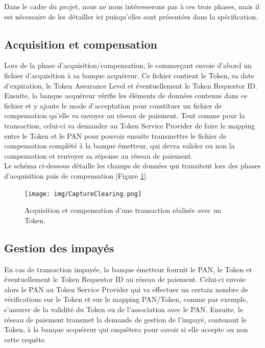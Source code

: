 \documentclass{report}
\begin{document}
\noindent
Dans le cadre du projet, nous ne nous intéresserons pas à ces trois phases, mais il est nécessaire de les détailler ici puisqu'elles sont présentées dans la spécification.

\subsection{Acquisition et compensation}
Lors de la phase d'acquisition/compensation, le commerçant envoie d'abord un fichier d'acquisition à sa banque acquéreur. Ce fichier contient le Token, sa date d'expiration, le Token Assurance Level et éventuellement le Token Requestor ID. Ensuite, la banque acquéreur vérifie les éléments de données contenus dans ce fichier et y ajoute le mode d'acceptation pour constituer un fichier de compensation qu'elle va envoyer au réseau de paiement. Tout comme pour la transaction, celui-ci va demander au Token Service Provider de faire le mapping entre le Token et le PAN pour pouvoir ensuite transmettre le fichier de compensation complété à la banque émetteur, qui devra valider ou non la compensation et renvoyer sa réponse au réseau de paiement.\\

\newpage
\noindent
Le schéma ci-dessous détaille les champs de données qui transitent lors des phases d'acquisition puis de compensation [Figure \ref{CaptureClearing}].

\begin{figure}[!ht]
    \centering
			\texttt{[image: img/CaptureClearing.png]}
			\caption{\label{CaptureClearing} Acquisition et compensation d'une transaction réalisée avec un Token.}			
\end{figure}

\subsection{Gestion des impayés}
En cas de transaction impayée, la banque émetteur fournit le PAN, le Token et éventuellement le Token Requestor ID au réseau de paiement. Celui-ci envoie alors le PAN au Token Service Provider qui va effectuer un certain nombre de vérifications sur le Token et sur le mapping PAN/Token, comme par exemple, s'assurer de la validité du Token ou de l'association avec le PAN. Ensuite, le réseau de paiement transmet la demande de gestion de l'impayé, contenant le Token, à la banque acquéreur qui enquêtera pour savoir si elle accepte ou non cette requête.\\
\end{document}
